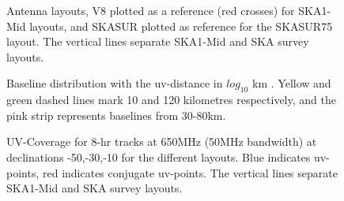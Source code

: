 \documentclass[sfheadings,a4paper,times,9pt,floats,floatfix]{article}
\begin{document}
\begin{figure}[H]
 \tiny{}
 \caption{Antenna layouts, V8 plotted as a reference (red crosses) for SKA1-Mid layouts, and SKASUR
plotted as reference for the SKASUR75 layout. The vertical lines separate SKA1-Mid and SKA
survey layouts.}\label{fig:lay}
\end{figure}
\begin{figure}[H]
 \tiny{}
 \caption{Baseline distribution with the uv-distance in $log_{10}$ km . Yellow and green dashed lines mark 10 and 120
kilometres respectively, and the pink strip represents baselines from 30-80km.}\label{fig:hist}
\end{figure}
%  
%  
\begin{figure}[H]
 \tiny{}
 \caption{UV-Coverage for 8-hr tracks at 650MHz (50MHz bandwidth) at declinations -50,-30,-10 for the different layouts. Blue
indicates uv-points, red indicates conjugate uv-points. The vertical lines separate SKA1-Mid and SKA
survey layouts.}\label{fig:uvcov}
\end{figure}
\end{document}
